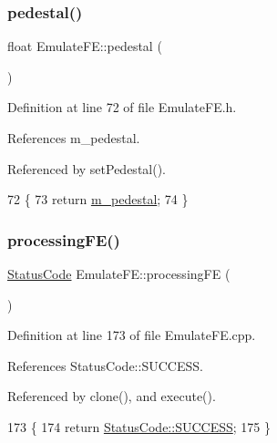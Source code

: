 \subsubsection{\texorpdfstring{pedestal()}{pedestal()}}
{\footnotesize\ttfamily float Emulate\+F\+E\+::pedestal (\begin{DoxyParamCaption}{ }\end{DoxyParamCaption})\hspace{0.3cm}{\ttfamily [inline]}}



Definition at line 72 of file Emulate\+F\+E.\+h.



References m\+\_\+pedestal.



Referenced by set\+Pedestal().


\begin{DoxyCode}
72                   \{
73     \textcolor{keywordflow}{return} \hyperlink{classEmulateFE_a033996ce759c11305395ac865a6c074a}{m\_pedestal};
74   \}
\end{DoxyCode}
\mbox{\label{classEmulateFE_adf7213a308c8a04f4d7efbb86a13689e}} 
\subsubsection{\texorpdfstring{processing\+F\+E()}{processingFE()}}
{\footnotesize\ttfamily \hyperlink{classStatusCode}{Status\+Code} Emulate\+F\+E\+::processing\+FE (\begin{DoxyParamCaption}{ }\end{DoxyParamCaption})\hspace{0.3cm}{\ttfamily [protected]}}



Definition at line 173 of file Emulate\+F\+E.\+cpp.



References Status\+Code\+::\+S\+U\+C\+C\+E\+SS.



Referenced by clone(), and execute().


\begin{DoxyCode}
173                                     \{
174   \textcolor{keywordflow}{return} \hyperlink{classStatusCode_a6f565cbeadc76d14c72f047e5e85eb4badd0da38d3ba0d922efd1f4619bc37ad8}{StatusCode::SUCCESS};
175 \}
\end{DoxyCode}
\mbox{\label{classAttrib_a7d4ef7e32d93cb287792b87b857e79f3}} 
